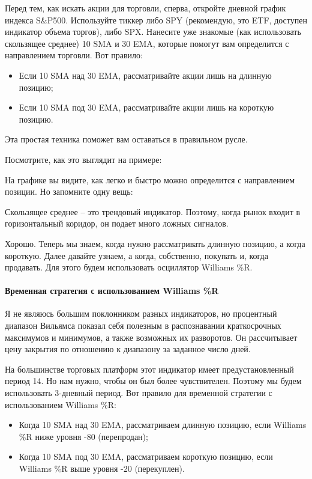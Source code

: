 \documentclass{book}
\begin{document}
Перед тем, как искать акции для торговли, сперва, откройте дневной график индекса S\&P500. Используйте тиккер либо SPY (рекомендую, это ETF, доступен индикатор объема торгов), либо SPX. Нанесите уже знакомые (как использовать скользящее среднее) 10 SMA и 30 EMA, которые помогут вам определится с направлением торговли. Вот правило:
\begin{itemize}
\item     Если 10 SMA над 30 EMA, рассматривайте акции лишь на длинную позицию;
\item     Если 10 SMA под 30 EMA, рассматривайте акции лишь на короткую позицию.
\end{itemize}

Эта простая техника поможет вам оставаться в правильном русле.

Посмотрите, как это выглядит на примере:

На графике вы видите, как легко и быстро можно определится с направлением позиции. Но запомните одну вещь:

Скользящее среднее – это трендовый индикатор. Поэтому, когда рынок входит в горизонтальный коридор, он подает много ложных сигналов.

Хорошо. Теперь мы знаем, когда нужно рассматривать длинную позицию, а когда короткую. Далее давайте узнаем, а когда, собственно, покупать и, когда продавать. Для этого будем использовать осциллятор Williams \%R.

\paragraph{Временная стратегия с использованием Williams \%R}

Я не являюсь большим поклонником разных индикаторов, но процентный диапазон Вильямса показал себя полезным в распознавании краткосрочных максимумов и минимумов, а также возможных их разворотов. Он рассчитывает цену закрытия по отношению к диапазону за заданное число дней.

На большинстве торговых платформ этот индикатор имеет предустановленный период 14. Но нам нужно, чтобы он был более чувствителен. Поэтому мы будем использовать 3-дневный период. Вот правило для временной стратегии с использованием Williams \%R:
\begin{itemize}
\item     Когда 10 SMA над 30 EMA, рассматриваем длинную позицию, если Williams \%R ниже уровня -80 (перепродан);
\item     Когда 10 SMA под 30 EMA, рассматриваем короткую позицию, если Williams \%R выше уровня -20 (перекуплен).
\end{itemize}
\end{document}
